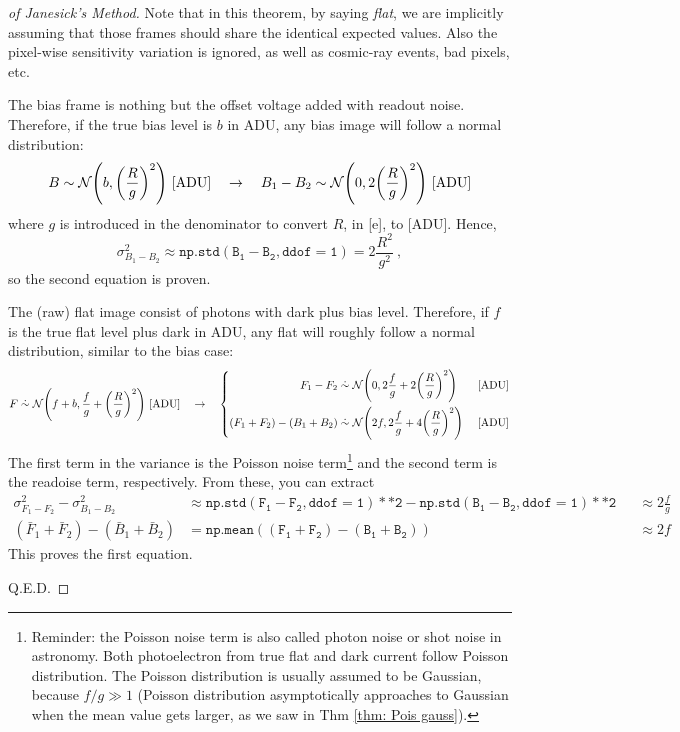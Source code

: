 \begin{proof}[of Janesick's Method]
Note that in this theorem, by saying \textit{flat}, we are implicitly assuming that those frames should share the identical expected values. Also the pixel-wise sensitivity variation is ignored, as well as cosmic-ray events, bad pixels, etc.

The bias frame is nothing but the offset voltage added with readout noise. Therefore, if the true bias level is $ b $ in ADU, any bias image will follow a normal distribution:
\begin{equation*}
  B \sim \mathcal{N} \qty( b, \qty(\frac{R}{g})^2 ) ~\mathrm{[ADU]}
  \quad \rightarrow \quad
  B_1 - B_2 \sim \mathcal{N} \qty( 0, 2\qty(\frac{R}{g})^2 ) ~\mathrm{[ADU]}
\end{equation*}
where $ g $ is introduced in the denominator to convert $ R $, in [e], to [ADU]. Hence, 
\begin{equation*}
  \sigma^2_{B_1 - B_2} \approx \mathtt{np.std(B_1 - B_2, ddof=1)}
    = 2\frac{R^2}{g^2} ~,
\end{equation*}
so the second equation is proven. 

The (raw) flat image consist of photons with dark plus bias level. Therefore, if $ f $ is the true flat level plus dark in ADU, any flat will roughly follow a normal distribution, similar to the bias case: 
\begin{equation*}
  F \mathrel{\dot{\sim}} \mathcal{N} \qty( f + b, \frac{f}{g} + \qty(\frac{R}{g})^2 ) ~\mathrm{[ADU]}
  \quad \rightarrow \quad  
  \left \{
  \begin{aligned}
    F_1 - F_2 &\mathrel{\dot{\sim}} 
      \mathcal{N} \qty( 0, 2\frac{f}{g} + 2 \qty(\frac{R}{g})^2 ) &~\mathrm{[ADU]}\\
    (F_1 + F_2) - (B_1 + B_2) & \mathrel{\dot{\sim}} 
      \mathcal{N} \qty(2f, 2 \frac{f}{g} + 4 \qty( \frac{R}{g} )^2) &~\mathrm{[ADU]}
  \end{aligned}
  \right .
\end{equation*}
The first term in the variance is the Poisson noise term\footnote{Reminder: the Poisson noise term is also called photon noise or shot noise in astronomy. Both photoelectron from true flat and dark current follow Poisson distribution. The Poisson distribution is usually assumed to be Gaussian, because $ f/g \gg 1 $ (Poisson distribution asymptotically approaches to Gaussian when the mean value gets larger, as we saw in Thm \ref{thm: Pois gauss}).} and the second term is the readoise term, respectively. From these, you can extract
\begin{align*}
  \sigma^2_{F_1 - F_2} - \sigma^2_{B_1 - B_2} 
    &\approx \mathtt{np.std(F_1 - F_2, ddof=1)**2} - \mathtt{np.std(B_1 - B_2, ddof=1)**2}
    &&\approx 2\frac{f}{g}\\
  (\bar{F}_1 + \bar{F}_2) - (\bar{B}_1 + \bar{B}_2)
   &= \mathtt{np.mean((F_1 + F_2) - (B_1 + B_2))} 
   &&\approx 2f
\end{align*}
This proves the first equation.

Q.E.D.
\end{proof}

